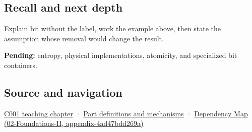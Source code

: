 \subsection{Recall and next depth}\label{appendix-ddbb69998a2e-recall-and-next-depth}

Explain bit without the label, work the example above, then state the assumption whose removal would change the result.

\textbf{Pending:} entropy, physical implementations, atomicity, and specialized bit containers.

\subsection{Source and navigation}\label{appendix-ddbb69998a2e-source-and-navigation}

\hyperref[01-foundations-i-ch001-from-a-signal-to-an-interpretation]{C001 teaching chapter} · \hyperref[appendix-fd090d982a15]{Part definitions and mechanisms} · \href{../02-Foundations-II/main.pdf\#nameddest=appendix-4ad47bdd269a}{Dependency Map (02-Foundations-II, appendix-4ad47bdd269a)}
